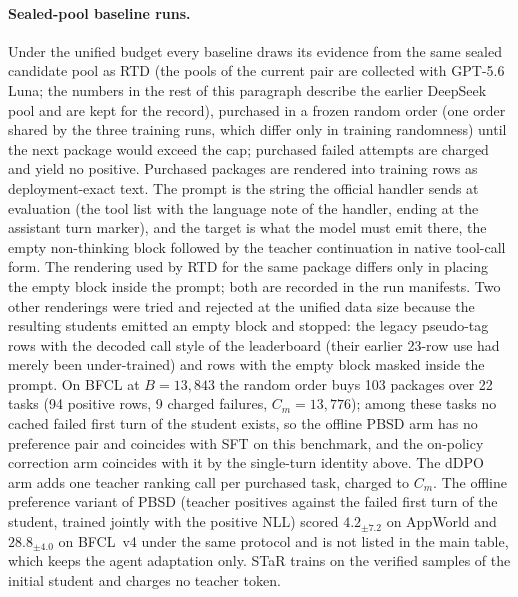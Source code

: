 \paragraph{Sealed-pool baseline runs.}
Under the unified budget every baseline draws its evidence from the
same sealed candidate pool as RTD (the pools of the current pair are
collected with GPT-5.6 Luna; the numbers in the rest of this paragraph
describe the earlier DeepSeek pool and are kept for the record), purchased in a frozen random order
(one order shared by the three training runs, which differ only in
training randomness) until the next package would exceed the cap;
purchased failed attempts are charged and yield no positive. Purchased
packages are rendered into training rows as deployment-exact text.
The prompt is the string the official handler sends at evaluation
(the tool list with the language note of the handler, ending at the
assistant turn marker), and the target is what the model must emit
there, the empty non-thinking block followed by the teacher
continuation in native tool-call form. The rendering used by RTD for
the same package differs only in placing the empty block inside the
prompt; both are recorded in the run manifests. Two other renderings
were tried and rejected at the unified data size because the resulting
students emitted an empty block and stopped: the legacy pseudo-tag
rows with the decoded call style of the leaderboard (their earlier
23-row use had merely been under-trained) and rows with the empty
block masked inside the prompt. On BFCL at $B=13{,}843$ the random
order buys 103 packages over 22 tasks (94 positive rows, 9 charged
failures, $C_m=13{,}776$); among these tasks no cached failed first
turn of the student exists, so the offline PBSD arm has no
preference pair and coincides with SFT on this benchmark,
and the on-policy correction arm coincides with it by the single-turn
identity above. The dDPO arm adds one teacher ranking call per
purchased task, charged to $C_m$. The offline preference variant of
PBSD (teacher positives against the failed first turn of the student,
trained jointly with the positive NLL) scored $4.2_{\pm7.2}$ on
AppWorld and $28.8_{\pm4.0}$ on BFCL~v4 under the same protocol and is
not listed in the main table, which keeps the agent adaptation only. STaR trains on the verified samples
of the initial student and charges no teacher token.

